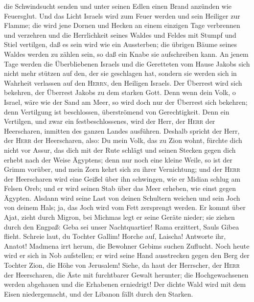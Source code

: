 die Schwindsucht senden und unter seinen Edlen einen Brand anzünden wie
Feuersglut.  Und das Licht Israels wird zum Feuer werden
und sein Heiliger zur Flamme; die wird jene Dornen und Hecken an einem
einzigen Tage verbrennen und verzehren  und die
Herrlichkeit seines Waldes und Feldes mit Stumpf und Stiel vertilgen,
daß es sein wird wie ein Aussterben;  die übrigen Bäume
seines Waldes werden zu zählen sein, so daß ein Knabe sie aufschreiben
kann.  An jenem Tage werden die Überbliebenen Israels und
die Geretteten vom Hause Jakobs sich nicht mehr stützen auf den, der sie
geschlagen hat, sondern sie werden sich in Wahrheit verlassen auf den
\textsc{Herrn}, den Heiligen Israels.  Der Überrest wird
sich bekehren, der Überrest Jakobs zu dem starken Gott. 
Denn wenn dein Volk, o Israel, wäre wie der Sand am Meer, so wird doch
nur der Überrest sich bekehren; denn Vertilgung ist beschlossen,
überströmend von Gerechtigkeit.  Denn ein Vertilgen, und
zwar ein festbeschlossenes, wird der Herr, der \textsc{Herr} der
Heerscharen, inmitten des ganzen Landes ausführen. 
Deshalb spricht der Herr, der \textsc{Herr} der Heerscharen, also: Du
mein Volk, das zu Zion wohnt, fürchte dich nicht vor Assur, das dich mit
der Rute schlägt und seinen Stecken gegen dich erhebt nach der Weise
Ägyptens;  denn nur noch eine kleine Weile, so ist der
Grimm vorüber, und mein Zorn kehrt sich zu ihrer Vernichtung;
 und der \textsc{Herr} der Heerscharen wird eine Geißel
über ihn schwingen, wie er Midian schlug am Felsen Oreb; und er wird
seinen Stab über das Meer erheben, wie einst gegen Ägypten.
 Alsdann wird seine Last von deinen Schultern weichen und
sein Joch von deinem Hals; ja, das Joch wird vom Fett zersprengt werden.
 Er kommt über Ajat, zieht durch Migron, bei Michmas legt
er seine Geräte nieder;  sie ziehen durch den Engpaß:
Geba sei unser Nachtquartier! Rama erzittert, Sauls Gibea flieht.
 Schreie laut, du Tochter Gallim! Horche auf, Laischa!
Antworte ihr, Anatot!  Madmena irrt herum, die Bewohner
Gebims suchen Zuflucht.  Noch heute wird er sich in Nob
aufstellen; er wird seine Hand ausstrecken gegen den Berg der Tochter
Zion, die Höhe von Jerusalem!  Siehe, da haut der
Herrscher, der \textsc{Herr} der Heerscharen, die Äste mit furchtbarer
Gewalt herunter; die Hochgewachsenen werden abgehauen und die Erhabenen
erniedrigt!  Der dichte Wald wird mit dem Eisen
niedergemacht, und der Libanon fällt durch den Starken.

